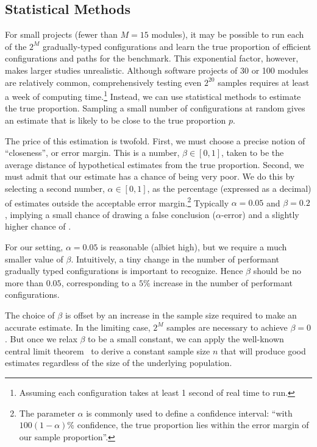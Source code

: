 \documentclass{article}
\begin{document}
\subsection{Statistical Methods}
For small projects (fewer than $M=15$ modules), it may be possible to run each of the $2^M$ gradually-typed configurations and learn the true proportion of efficient configurations and paths for the benchmark.
This exponential factor, however, makes larger studies unrealistic.
Although software projects of 30 or 100 modules are relatively common, comprehensively testing even $2^{20}$ samples requires at least a week of computing time.\footnote{Assuming each configuration takes at least 1 second of real time to run.}
Instead, we can use statistical methods to estimate the true proportion.
Sampling a small number of configurations at random gives an estimate that is likely to be close to the true proportion $p$.

The price of this estimation is twofold.
First, we must choose a precise notion of ``closeness'', or error margin.
This is a number, $\beta \in [0, 1]$, taken to be the average distance of hypothetical estimates from the true proportion.
Second, we must admit that our estimate has a chance of being very poor.
We do this by selecting a second number, $\alpha \in [0,1]$, as the percentage (expressed as a decimal) of estimates outside the acceptable error margin.\footnote{The parameter $\alpha$ is commonly used to define a confidence interval: ``with $100(1 - \alpha)\%$ confidence, the true proportion lies within the error margin of our sample proportion''.}
Typically $\alpha = 0.05$ and $\beta = 0.2$, implying a small chance of drawing a false conclusion ($\alpha$-error) and a slightly higher chance of .

For our setting, $\alpha = 0.05$ is reasonable (albiet high), but we require a much smaller value of $\beta$.
Intuitively, a tiny change in the number of performant gradually typed configurations is important to recognize.
Hence $\beta$ should be no more than $0.05$, corresponding to a $5\%$ increase in the number of performant configurations.

The choice of $\beta$ is offset by an increase in the sample size required to make an accurate estimate.
In the limiting case, $2^M$ samples are necessary to achieve $\beta = 0$.
But once we relax $\beta$ to be a small constant, we can apply the well-known central limit theorem~\cite{todo} to derive a constant sample size $n$ that will produce good estimates regardless of the size of the underlying population.
\end{document}
